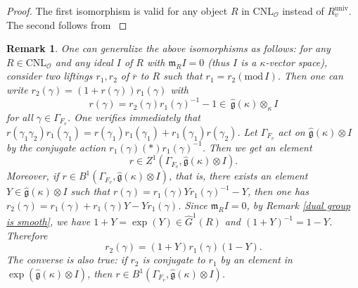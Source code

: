 \documentclass[12pt,oneside,reqno]{amsart}
\theoremstyle{plain}
\newtheorem{remark}[theorem]{Remark}
\begin{document}
	\begin{proof}
		The first isomorphism is valid for any
		object
		$R$ in
		$\mathrm{CNL}_\mathcal{O}$
		instead of $R^\mathrm{univ}_v$.	
		The second follows from
		\cite[Lemma 3.1 \& Proposition 3.2]{Tilouine2002}
	\end{proof}
	\begin{remark}\label{isomorphism of general tangent spaces}\rm 
		One can generalize the above isomorphisms
		as follows:
		for any $R\in\mathrm{CNL}_\mathcal{O}$ and
		any ideal $I$ of $R$ with
		$\mathfrak{m}_RI=0$
		(thus $I$ is a $\kappa$-vector space),
		consider two liftings
		$r_1,r_2$ of
		$\overline{r}$ to $R$
		such that
		$r_1=r_2
		(\mathrm{mod}\,I)$.
		Then one can write
		$r_2(\gamma)
		=
		(1+r(\gamma))
		r_1(\gamma)$
		with
		\[
		r(\gamma)
		=
		r_2(\gamma)r_1(\gamma)^{-1}-1
		\in
		\,
		\widehat{\mathfrak{g}}(\kappa)\otimes_\kappa I
		\]
		for all
		$\gamma\in\Gamma_{F_v}$.
		One verifies immediately that
		$r(\gamma_1\gamma_2)r_1(\gamma_1)
		=
		r(\gamma_1)r_1(\gamma_1)
		+
		r_1(\gamma_1)r(\gamma_2)$.
		Let
		$\Gamma_{F_v}$
		act on
		$\widehat{\mathfrak{g}}(\kappa)\otimes I$
		by the conjugate action
		$r_1(\gamma)(\ast)r_1(\gamma)^{-1}$.
		Then we get an element
		\[
		r\in
		Z^1
		(
		\Gamma_{F_v},
		\widehat{\mathfrak{g}}
		(\kappa)\otimes I
		).
		\]
		Moreover,
		if $r\in B^1(\Gamma_{F_v},
		\widehat{\mathfrak{g}}(\kappa)\otimes I)$,
		that is,
		there exists an element
		$Y\in\widehat{\mathfrak{g}}(\kappa)\otimes I$
		such that
		$r(\gamma)
		=r_1(\gamma)Yr_1(\gamma)^{-1}-Y$,
		then one has
		$r_2(\gamma)=r_1(\gamma)+
		r_1(\gamma)Y-Yr_1(\gamma)$.
		Since
		$\mathfrak{m}_RI=0$,
		by
		Remark \ref{dual group is smooth},
		we have
		$1+Y=\exp(Y)
		\in
		\widehat{G}^1(R)$
		and
		$(1+Y)^{-1}=1-Y$.
		Therefore
		\[
		r_2(\gamma)=(1+Y)r_1(\gamma)(1-Y).
		\]
		The converse is also true:
		if $r_2$ is conjugate to $r_1$ by an element in
		$\exp(\widehat{\mathfrak{g}}(\kappa)\otimes I)$,
		then
		$r\in
		B^1(\Gamma_{F_v},
		\widehat{\mathfrak{g}}(\kappa)\otimes I)$.  
		
		
		

\end{remark}
\end{document}
